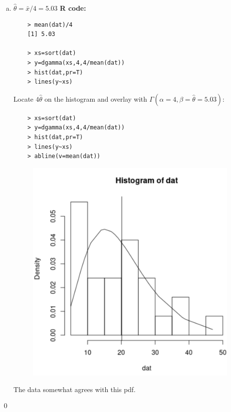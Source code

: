 \documentclass{book}
\theoremstyle{definition}
\newcommand{\be}{\beta}
\begin{document}
\begin{enumerate}[(a)]
	
	
	\newpage
	
	\item $\boxed{\hat\theta = \bar{x}/4 = 5.03}$ \textbf{R code:}
	\begin{lstlisting}
	> mean(dat)/4
	[1] 5.03
	
	> xs=sort(dat)
	> y=dgamma(xs,4,4/mean(dat))
	> hist(dat,pr=T)
	> lines(y~xs)
	\end{lstlisting}
	Locate $4\hat\theta$ on the histogram and overlay with $\Gamma(\alpha =4, \be = \hat\theta = 5.03)$:
	\begin{lstlisting}
	> xs=sort(dat)
	> y=dgamma(xs,4,4/mean(dat))
	> hist(dat,pr=T)
	> lines(y~xs)
	> abline(v=mean(dat))
	\end{lstlisting}
	\begin{figure}[!htb]
		\centering
		\includegraphics[scale=0.2]{dat611a}
	\end{figure}
	The data somewhat agrees with this pdf. 
	
\end{enumerate}

\qed
\end{document}
